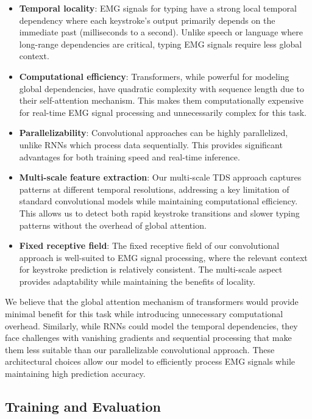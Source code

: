 \begin{itemize}
    \item \textbf{Temporal locality}: EMG signals for typing have a strong local temporal dependency where each keystroke's output primarily depends on the immediate past (milliseconds to a second). Unlike speech or language where long-range dependencies are critical, typing EMG signals require less global context.

    \item \textbf{Computational efficiency}: Transformers, while powerful for modeling global dependencies, have quadratic complexity with sequence length due to their self-attention mechanism. This makes them computationally expensive for real-time EMG signal processing and unnecessarily complex for this task.

    \item \textbf{Parallelizability}: Convolutional approaches can be highly parallelized, unlike RNNs which process data sequentially. This provides significant advantages for both training speed and real-time inference.

    \item \textbf{Multi-scale feature extraction}: Our multi-scale TDS approach captures patterns at different temporal resolutions, addressing a key limitation of standard convolutional models while maintaining computational efficiency. This allows us to detect both rapid keystroke transitions and slower typing patterns without the overhead of global attention.

    \item \textbf{Fixed receptive field}: The fixed receptive field of our convolutional approach is well-suited to EMG signal processing, where the relevant context for keystroke prediction is relatively consistent. The multi-scale aspect provides adaptability while maintaining the benefits of locality.
\end{itemize}

We believe that the global attention mechanism of transformers would provide minimal benefit for this task while introducing unnecessary computational overhead. Similarly, while RNNs could model the temporal dependencies, they face challenges with vanishing gradients and sequential processing that make them less suitable than our parallelizable convolutional approach. These architectural choices allow our model to efficiently process EMG signals while maintaining high prediction accuracy.

\subsection{Training and Evaluation}

